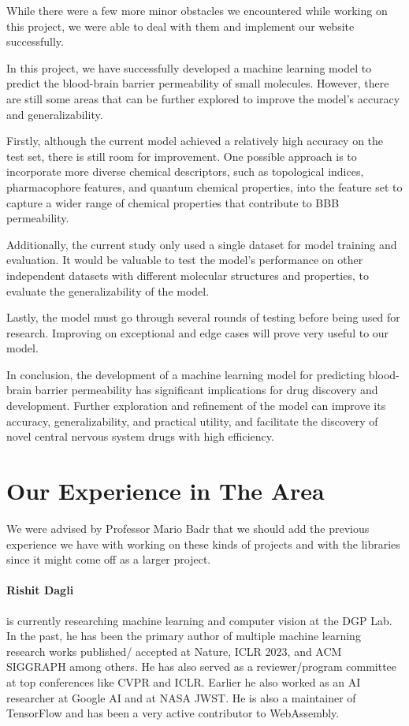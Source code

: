 \documentclass[fontsize=11pt]{article}
\begin{document}
While there were a few more minor obstacles we encountered while working on this project, we were able to deal with them and implement our website successfully. 

In this project, we have successfully developed a machine learning model to predict the blood-brain barrier permeability of small molecules. However, there are still some areas that can be further explored to improve the model's accuracy and generalizability.

Firstly, although the current model achieved a relatively high accuracy on the test set, there is still room for improvement. One possible approach is to incorporate more diverse chemical descriptors, such as topological indices, pharmacophore features, and quantum chemical properties, into the feature set to capture a wider range of chemical properties that contribute to BBB permeability.

Additionally, the current study only used a single dataset for model training and evaluation. It would be valuable to test the model's performance on other independent datasets with different molecular structures and properties, to evaluate the generalizability of the model.

Lastly, the model must go through several rounds of testing before being used for research. Improving on exceptional and edge cases will prove very useful to our model.

In conclusion, the development of a machine learning model for predicting blood-brain barrier permeability has significant implications for drug discovery and development. Further exploration and refinement of the model can improve its accuracy, generalizability, and practical utility, and facilitate the discovery of novel central nervous system drugs with high efficiency.

\section*{Our Experience in The Area}

We were advised by Professor Mario Badr that we should add the previous experience we have with working on these kinds of projects and with the libraries since it might come off as a larger project.

\paragraph{Rishit Dagli} is currently researching machine learning and computer vision at the DGP Lab. In the past, he has been the primary author of multiple machine learning research works published/ accepted at Nature, ICLR 2023, and ACM SIGGRAPH among others. He has also served as a reviewer/program committee at top conferences like CVPR and ICLR. Earlier he also worked as an AI researcher at Google AI and at NASA JWST. He is also a maintainer of TensorFlow and has been a very active contributor to WebAssembly.
\end{document}
